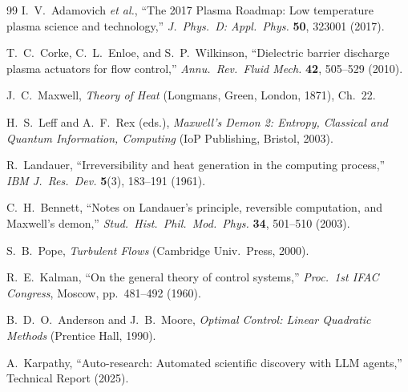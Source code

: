 \documentclass[12pt,twocolumn]{article}
\begin{document}
\begin{thebibliography}{99}
I.~V.~Adamovich \textit{et al.}, ``The 2017 Plasma Roadmap: Low
temperature plasma science and technology,'' \textit{J.\ Phys.\ D:
Appl.\ Phys.} \textbf{50}, 323001 (2017).

T.~C.~Corke, C.~L.~Enloe, and S.~P.~Wilkinson, ``Dielectric barrier
discharge plasma actuators for flow control,'' \textit{Annu.\ Rev.\
Fluid Mech.} \textbf{42}, 505--529 (2010).

J.~C.~Maxwell, \textit{Theory of Heat} (Longmans, Green, London,
1871), Ch.~22.

H.~S.~Leff and A.~F.~Rex (eds.), \textit{Maxwell's Demon 2: Entropy,
Classical and Quantum Information, Computing} (IoP Publishing,
Bristol, 2003).

R.~Landauer, ``Irreversibility and heat generation in the computing
process,'' \textit{IBM J.\ Res.\ Dev.} \textbf{5}(3), 183--191
(1961).

C.~H.~Bennett, ``Notes on Landauer's principle, reversible
computation, and Maxwell's demon,'' \textit{Stud.\ Hist.\ Phil.\
Mod.\ Phys.} \textbf{34}, 501--510 (2003).


S.~B.~Pope, \textit{Turbulent Flows} (Cambridge Univ.\ Press,
2000).

R.~E.~Kalman, ``On the general theory of control systems,''
\textit{Proc.\ 1st IFAC Congress}, Moscow, pp.~481--492 (1960).

\bibitem{Anderson1990}
B.~D.~O.~Anderson and J.~B.~Moore, \textit{Optimal Control: Linear
Quadratic Methods} (Prentice Hall, 1990).

A.~Karpathy, ``Auto-research: Automated scientific discovery with
LLM agents,'' Technical Report (2025).

\end{thebibliography}
\end{document}
